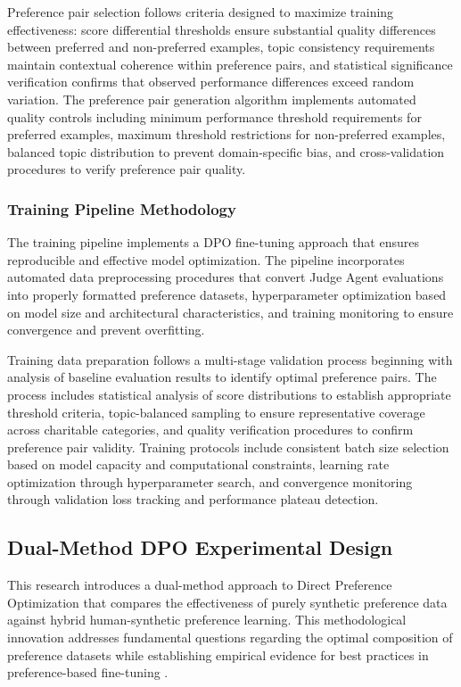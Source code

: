 Preference pair selection follows criteria designed to maximize training effectiveness: score differential thresholds ensure substantial quality differences between preferred and non-preferred examples, topic consistency requirements maintain contextual coherence within preference pairs, and statistical significance verification confirms that observed performance differences exceed random variation. The preference pair generation algorithm implements automated quality controls including minimum performance threshold requirements for preferred examples, maximum threshold restrictions for non-preferred examples, balanced topic distribution to prevent domain-specific bias, and cross-validation procedures to verify preference pair quality.

\subsubsection{Training Pipeline Methodology}

The training pipeline implements a DPO fine-tuning approach that ensures reproducible and effective model optimization. The pipeline incorporates automated data preprocessing procedures that convert Judge Agent evaluations into properly formatted preference datasets, hyperparameter optimization based on model size and architectural characteristics, and training monitoring to ensure convergence and prevent overfitting.

Training data preparation follows a multi-stage validation process beginning with analysis of baseline evaluation results to identify optimal preference pairs. The process includes statistical analysis of score distributions to establish appropriate threshold criteria, topic-balanced sampling to ensure representative coverage across charitable categories, and quality verification procedures to confirm preference pair validity. Training protocols include consistent batch size selection based on model capacity and computational constraints, learning rate optimization through hyperparameter search, and convergence monitoring through validation loss tracking and performance plateau detection.

\subsection{Dual-Method DPO Experimental Design}
\label{sec:dual-method-dpo}

This research introduces a dual-method approach to Direct Preference Optimization that compares the effectiveness of purely synthetic preference data against hybrid human-synthetic preference learning. This methodological innovation addresses fundamental questions regarding the optimal composition of preference datasets while establishing empirical evidence for best practices in preference-based fine-tuning \cite{gallego2024configurable_safety, chen2024refined_dpo}.

